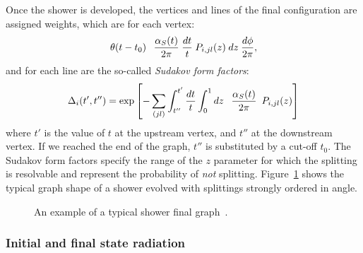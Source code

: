 Once the shower is developed, the vertices and lines of the final configuration are
assigned weights, which are for each vertex:
  \begin{equation}
    \label{eq:splitvert} \theta (t - t_0) \hspace{0.75em} \frac{\alpha_S
    (t)}{2 \pi} \hspace{0.25em} \frac{dt}{t} \hspace{0.25em} P_{i, j l} (z)
    \hspace{0.25em} dz \hspace{0.25em} \frac{d \phi}{2 \pi},
  \end{equation}
and for each line are the so-called {\it Sudakov form factors}:
  \begin{equation}
    \label{eq:sudadef} \Delta_i (t', t'') = \exp \left[ - \sum_{(j l)}
    \int_{t''}^{t'} \frac{dt}{t} \int_0^1 d z \hspace{0.75em} \frac{\alpha_S
    (t)}{2 \pi} \hspace{0.25em} \hspace{0.25em} P_{i, j l} (z) \right]
  \end{equation}
where $t'$ is the value of $t$ at the upstream vertex, and $t''$ 
at the downstream vertex. If we reached the end of the graph,
$t''$ is substituted by a cut-off $t_0$.
The Sudakov form factors specify the range of the $z$ parameter for 
which the splitting is resolvable and represent the probability
of {\it not} splitting. Figure~\ref{fig:showergraph} shows
the typical graph shape of a shower evolved with splittings
strongly ordered in angle.

\begin{figure}[hbt]\begin{center}
	\caption{An example of a typical shower final graph~\cite{Ambroglini:2009nz}.\label{fig:showergraph}}
\end{center}\end{figure}

\subsubsection{Initial and final state radiation}\label{sec:isrfsr}

